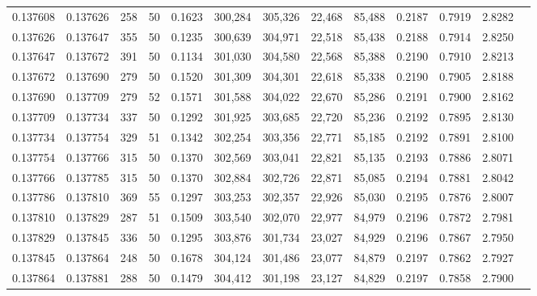 \begin{tabular}{rrrrrrrrrrrrr}
0.137608 & 0.137626 &   258 &  50 &                                     0.1623 & 300,284 & 305,326 &  22,468 &  85,488 & 0.2187 & 0.7919 & 2.8282 \\
0.137626 & 0.137647 &   355 &  50 &                                     0.1235 & 300,639 & 304,971 &  22,518 &  85,438 & 0.2188 & 0.7914 & 2.8250 \\
0.137647 & 0.137672 &   391 &  50 &                                     0.1134 & 301,030 & 304,580 &  22,568 &  85,388 & 0.2190 & 0.7910 & 2.8213 \\
0.137672 & 0.137690 &   279 &  50 &                                     0.1520 & 301,309 & 304,301 &  22,618 &  85,338 & 0.2190 & 0.7905 & 2.8188 \\
0.137690 & 0.137709 &   279 &  52 &                                     0.1571 & 301,588 & 304,022 &  22,670 &  85,286 & 0.2191 & 0.7900 & 2.8162 \\
0.137709 & 0.137734 &   337 &  50 &                                     0.1292 & 301,925 & 303,685 &  22,720 &  85,236 & 0.2192 & 0.7895 & 2.8130 \\
0.137734 & 0.137754 &   329 &  51 &                                     0.1342 & 302,254 & 303,356 &  22,771 &  85,185 & 0.2192 & 0.7891 & 2.8100 \\
0.137754 & 0.137766 &   315 &  50 &                                     0.1370 & 302,569 & 303,041 &  22,821 &  85,135 & 0.2193 & 0.7886 & 2.8071 \\
0.137766 & 0.137785 &   315 &  50 &                                     0.1370 & 302,884 & 302,726 &  22,871 &  85,085 & 0.2194 & 0.7881 & 2.8042 \\
0.137786 & 0.137810 &   369 &  55 &                                     0.1297 & 303,253 & 302,357 &  22,926 &  85,030 & 0.2195 & 0.7876 & 2.8007 \\
0.137810 & 0.137829 &   287 &  51 &                                     0.1509 & 303,540 & 302,070 &  22,977 &  84,979 & 0.2196 & 0.7872 & 2.7981 \\
0.137829 & 0.137845 &   336 &  50 &                                     0.1295 & 303,876 & 301,734 &  23,027 &  84,929 & 0.2196 & 0.7867 & 2.7950 \\
0.137845 & 0.137864 &   248 &  50 &                                     0.1678 & 304,124 & 301,486 &  23,077 &  84,879 & 0.2197 & 0.7862 & 2.7927 \\
0.137864 & 0.137881 &   288 &  50 &                                     0.1479 & 304,412 & 301,198 &  23,127 &  84,829 & 0.2197 & 0.7858 & 2.7900 \\

\end{tabular}
